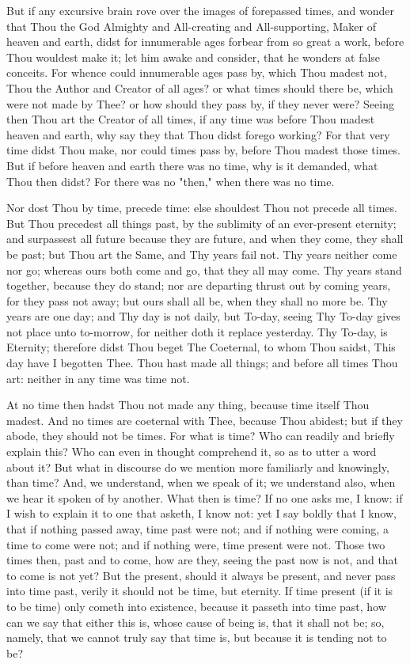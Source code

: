 \documentclass[b5paper,openright,12pt,twoside]{book}
\begin{document}
But if any excursive brain rove over the images of forepassed times, and
wonder that Thou the God Almighty and All-creating and All-supporting,
Maker of heaven and earth, didst for innumerable ages forbear from so
great a work, before Thou wouldest make it; let him awake and consider,
that he wonders at false conceits. For whence could innumerable ages
pass by, which Thou madest not, Thou the Author and Creator of all
ages? or what times should there be, which were not made by Thee? or
how should they pass by, if they never were? Seeing then Thou art the
Creator of all times, if any time was before Thou madest heaven and
earth, why say they that Thou didst forego working? For that very time
didst Thou make, nor could times pass by, before Thou madest those
times. But if before heaven and earth there was no time, why is it
demanded, what Thou then didst? For there was no "then," when there was
no time.

Nor dost Thou by time, precede time: else shouldest Thou not precede
all times. But Thou precedest all things past, by the sublimity of
an ever-present eternity; and surpassest all future because they are
future, and when they come, they shall be past; but Thou art the Same,
and Thy years fail not. Thy years neither come nor go; whereas ours both
come and go, that they all may come. Thy years stand together, because
they do stand; nor are departing thrust out by coming years, for they
pass not away; but ours shall all be, when they shall no more be. Thy
years are one day; and Thy day is not daily, but To-day, seeing Thy
To-day gives not place unto to-morrow, for neither doth it replace
yesterday. Thy To-day, is Eternity; therefore didst Thou beget The
Coeternal, to whom Thou saidst, This day have I begotten Thee. Thou hast
made all things; and before all times Thou art: neither in any time was
time not.

At no time then hadst Thou not made any thing, because time itself Thou
madest. And no times are coeternal with Thee, because Thou abidest;
but if they abode, they should not be times. For what is time? Who can
readily and briefly explain this? Who can even in thought comprehend it,
so as to utter a word about it? But what in discourse do we mention more
familiarly and knowingly, than time? And, we understand, when we speak
of it; we understand also, when we hear it spoken of by another. What
then is time? If no one asks me, I know: if I wish to explain it to one
that asketh, I know not: yet I say boldly that I know, that if nothing
passed away, time past were not; and if nothing were coming, a time to
come were not; and if nothing were, time present were not. Those two
times then, past and to come, how are they, seeing the past now is
not, and that to come is not yet? But the present, should it always be
present, and never pass into time past, verily it should not be time,
but eternity. If time present (if it is to be time) only cometh into
existence, because it passeth into time past, how can we say that either
this is, whose cause of being is, that it shall not be; so, namely, that
we cannot truly say that time is, but because it is tending not to be?
\end{document}
